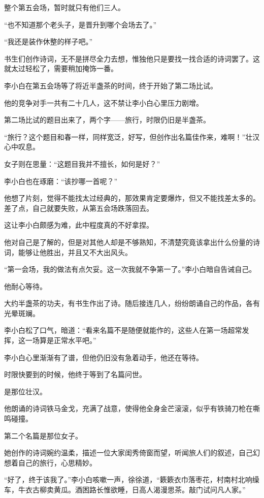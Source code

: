 \begin{this_body}
整个第五会场，暂时就只有他们三人。

“也不知道那个老头子，是晋升到哪个会场去了。”

“我还是装作休整的样子吧。”

书生们创作诗词，无不是拼尽全力去想，惟独他只是要找一找合适的诗词罢了。这就太过轻松了，需要稍加掩饰一番。

李小白在第五会场等了将近半盏茶的时间，终于开始了第二场比试。

他的竞争对手一共有二十几人，这不禁让李小白心里压力剧增。

第二场比试的题目出来了，两个字——旅行，时限仍旧是半盏茶。

“旅行？这个题目和春一样，同样宽泛，好写，但创作出名篇佳作来，难啊！”壮汉心中叹息。

女子则在思量：“这题目我并不擅长，如何是好？”

李小白也在琢磨：“该抄哪一首呢？”

他想了片刻，觉得不能找太过经典的，那效果肯定要爆炸，但又不能找差太多的。差了点，自己就要失败，从第五会场跌落回去。

这让李小白颇感为难，此中程度真的不好拿捏。

他对自己是了解的，但是对其他人却是不够熟知，不清楚究竟该拿出什么份量的诗词，能够让他胜出，并且又不大出风头。

“第一会场，我的做法有点欠妥。这一次我就不争第一了。”李小白暗自告诫自己。

他耐心等待。

大约半盏茶的功夫，有书生作出了诗。随后接连几人，纷纷朗诵自己的作品，各有光晕斑斓。

李小白松了口气，暗道：“看来名篇不是随便就能作的，这些人在第一场超常发挥，这一场算是正常水平吧。”

李小白心里渐渐有了谱，但他仍旧没有急着动手，他还在等待。

时限快要到的时候，他终于等到了名篇问世。

是那位壮汉。

他朗诵的诗词铁马金戈，充满了战意，使得他全身金芒滚滚，似乎有铁骑刀枪在嘶鸣碰撞。

第二个名篇是那位女子。

她创作的诗词婉约温柔，描述一位大家闺秀倚窗而望，听闻旅人们的叙述，自己幻想着自己的旅行，心思精妙。

“好了，终于该我了。”李小白咳嗽一声，徐徐道，“簌簌衣巾落枣花，村南村北响缲车，牛衣古柳卖黄瓜。酒困路长惟欲睡，日高人渴漫思茶。敲门试问凡人家。”


\end{this_body}
